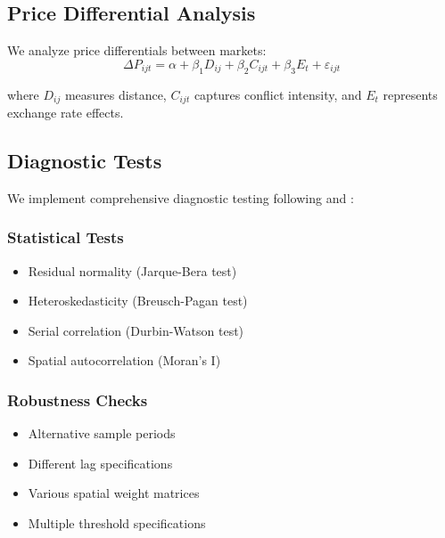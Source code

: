 \subsection{Price Differential Analysis}
We analyze price differentials between markets:
\vspace{-0.5em}
\begin{equation}
\Delta P_{ijt} = \alpha + \beta_1 D_{ij} + \beta_2 C_{ijt} + \beta_3 E_t + \varepsilon_{ijt}
\end{equation}
\vspace{-0.5em}

where $D_{ij}$ measures distance, $C_{ijt}$ captures conflict intensity, and $E_t$ represents exchange rate effects.

\subsection{Diagnostic Tests}
We implement comprehensive diagnostic testing following \citet{jarque1987test} and \citet{breusch1979simple}:

\subsubsection{Statistical Tests}
\begin{itemize}
\setlength{\itemsep}{0pt}  %
\item Residual normality (Jarque-Bera test)
\item Heteroskedasticity (Breusch-Pagan test)
\item Serial correlation (Durbin-Watson test)
\item Spatial autocorrelation (Moran's I)
\end{itemize}

\subsubsection{Robustness Checks}
\begin{itemize}
\setlength{\itemsep}{0pt}  %
\item Alternative sample periods
\item Different lag specifications
\item Various spatial weight matrices
\item Multiple threshold specifications
\end{itemize}
